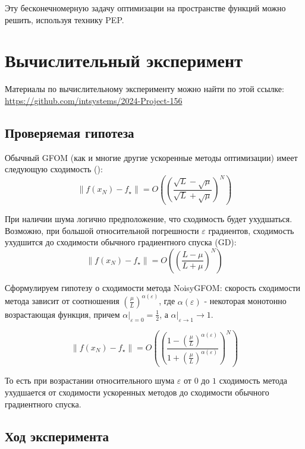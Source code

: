 \documentclass{article}
\begin{document}
Эту бесконечномерную задачу оптимизации на пространстве функций можно решить, используя технику PEP.

\section{Вычислительный эксперимент}
Материалы по вычислительному эксперименту можно найти по этой ссылке: \href{https://github.com/intsystems/2024-Project-156}{https://github.com/intsystems/2024-Project-156}

\subsection{Проверяемая гипотеза}
Обычный GFOM (как и многие другие ускоренные методы оптимизации) имеет следующую сходимость (\cite{convex_opt_mipt}):
\begin{equation} \label{GFOMconverge}
    \|f(x_N) - f_{\star}\| = O\left(\left(\frac{\sqrt{L} - \sqrt{\mu}}{\sqrt{L} + \sqrt{\mu}}\right)^N\right) 
\end{equation}

При наличии шума логично предположение, что сходимость будет ухудшаться. Возможно,  при большой относительной погрешности $\varepsilon$ градиентов, сходимость ухудшится до сходимости обычного градиентного спуска (GD):
\begin{equation}\label{GDconverge}
   \|f(x_N) - f_{\star}\| = O\left(\left(\frac{L - \mu}{L + \mu}\right)^N\right) 
\end{equation}

Сформулируем гипотезу о сходимости метода NoisyGFOM: скорость сходимости метода зависит от соотношения $\left(\frac{\mu}{L}\right)^{\alpha(\varepsilon)}$, где $\alpha(\varepsilon)$ - некоторая монотонно возрастающая функция, причем $\alpha|_{\varepsilon = 0} = \frac12$, а $\alpha|_{\varepsilon \rightarrow 1} \rightarrow 1$. 

\begin{equation}\label{NoisyGFOMconverge}
   \|f(x_N) - f_{\star}\| = O\left(\left(\frac{1 - \left(\frac{\mu}{L}\right)^{\alpha(\varepsilon)}}{1 + \left(\frac{\mu}{L}\right)^{\alpha(\varepsilon)}}\right)^N\right) 
\end{equation}

То есть при возрастании относительного шума $\varepsilon$ от $0$ до $1$ сходимость метода ухудшается от сходимости ускоренных методов до сходимости обычного градиентного спуска.

\subsection{Ход эксперимента}
\end{document}
